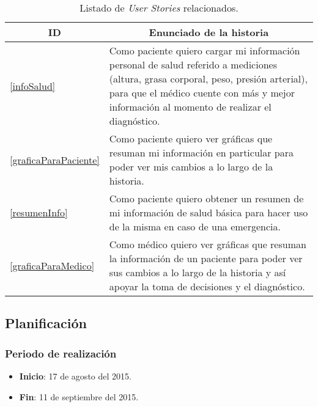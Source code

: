 \begin{table}[h]
	\centering
	\begin{tabular}{|m{1cm}|m{12cm}|}
		\hline
		\multicolumn{1}{|c|}{\textbf{ID}} &
		\multicolumn{1}{c|}{\textbf{Enunciado de la historia}} \\          
		\hline
		\ref{infoSalud} &
		Como paciente quiero cargar mi información personal de salud referido a mediciones (altura, grasa corporal, peso, presión arterial), para que el médico cuente con más y mejor información al momento de realizar el diagnóstico. 
		
		
		\\
		\hline
		\ref{graficaParaPaciente} &
		Como paciente quiero ver gráficas que resuman mi información en particular para poder ver mis cambios a lo largo de la historia. 
		
		
		\\
		\hline
		\ref{resumenInfo} &
		Como paciente quiero obtener un resumen de mi información de salud básica para hacer uso de la misma en caso de una emergencia. 
		
		
		\\
		\hline      
		\ref{graficaParaMedico} & Como médico quiero ver gráficas que resuman la información de un paciente para poder ver sus cambios a lo largo de la historia y así apoyar la toma de decisiones y el diagnóstico.\\
		\hline
	\end{tabular}
	\caption{Listado de \textit{User Stories} relacionados.}
	\label{US-Sprint4}
\end{table}




\subsection{Planificación}

\subsubsection{Periodo de realización}

\begin{itemize}
    \item \textbf{Inicio}: 17 de agosto del 2015.
    \item \textbf{Fin}: 11 de septiembre del 2015.
\end{itemize}


